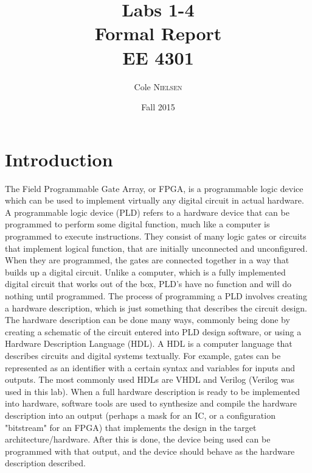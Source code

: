 \documentclass[12pt]{article}
\title{Labs 1-4 \\Formal Report\\ \vspace{0.3 in} EE 4301}
\author{Cole \textsc{Nielsen}}
\date{Fall 2015}
\begin{document}
\maketitle 

\pagebreak
\section{Introduction}
%
The Field Programmable Gate Array, or FPGA, is a programmable logic device which can be used to implement virtually any digital circuit in actual hardware. A programmable logic device (PLD) refers to a hardware device that can  be programmed to perform some digital function, much like a computer is programmed to execute instructions. They consist of many logic gates or circuits that implement logical function, that are initially unconnected and unconfigured. When they are programmed, the gates are connected together in a way that builds up a digital circuit. Unlike a computer, which is a fully implemented digital circuit that works out of the box, PLD's have no function and will do nothing until programmed. The process of programming a PLD involves creating a hardware description, which is just something that describes the circuit design. The hardware description can be done many ways, commonly being done by creating a schematic of the circuit entered into PLD design software, or using a Hardware Description Language (HDL). A HDL is a computer language that describes circuits and digital systems textually. For example, gates can be represented as an identifier with a certain syntax and variables for inputs and outputs. The most commonly used HDLs are VHDL and Verilog (Verilog was used in this lab). When a full hardware description is ready to be implemented into hardware, software tools are used to synthesize and compile the hardware description into an output (perhaps a mask for an IC, or a configuration "bitstream" for an FPGA) that implements the design in the target architecture/hardware. After this is done, the device being used can be programmed with that output, and the device should behave as the hardware description described.\\\par
\end{document}
